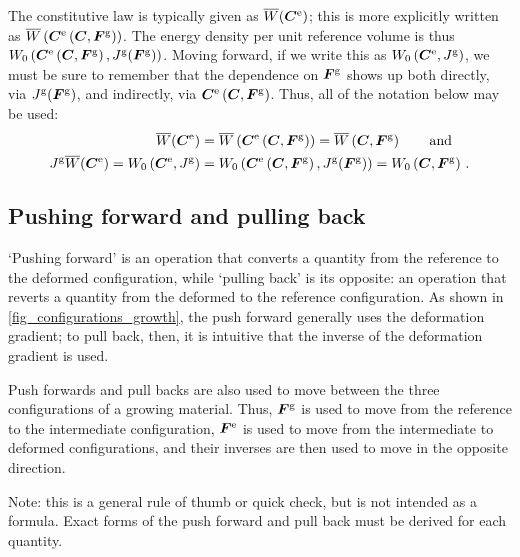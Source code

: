 \documentclass[10pt,letterpaper,oneside]{report}
\newcommand{\ten}[1]{\mbox{\boldmath $#1$}{}}
\newcommand{\scas}[1]{\mbox{{\scriptsize{${\rm{#1}}$}}}{}}
\begin{document}
The constitutive law is typically given as $\overline{W} (\ten{C}^{\scas{e}})$; this is more explicitly written as $\overline{W} \left(\ten{C}^{\scas{e}} \left( \ten{C}, \ten{F}^{\scas{g}} \right) \right)$.  
The energy density per unit reference volume is thus $W_0 \left(\ten{C}^{\scas{e}} \left( \ten{C}, \ten{F}^{\scas{g}} \right), J^{\scas{g}} ( \ten{F}^{\scas{g}} ) \right)$.  Moving forward, if we write this as $W_0 \left(\ten{C}^{\scas{e}}, J^{\scas{g}} \right)$, we must be sure to remember that the dependence on $\ten{F}^{\scas{g}}$ shows up both directly, via $J^{\scas{g}} (\ten{F}^{\scas{g}})$, and indirectly, via $\ten{C}^{\scas{e}} \left( \ten{C}, \ten{F}^{\scas{g}} \right)$.
Thus, all of the notation below may be used: 
\begin{align}
\overline{W} (\ten{C}^{\scas{e}}) &= \overline{W} \left(\ten{C}^{\scas{e}} \left( \ten{C}, \ten{F}^{\scas{g}} \right) \right) = \overline{W} \left( \ten{C}, \ten{F}^{\scas{g}} \right) \qquad \mbox{and} 
\\ 
J^{\scas{g}} \overline{W} (\ten{C}^{\scas{e}}) = W_0 \left(\ten{C}^{\scas{e}}, J^{\scas{g}} \right) &= W_0 \left(\ten{C}^{\scas{e}} \left( \ten{C}, \ten{F}^{\scas{g}} \right), J^{\scas{g}} ( \ten{F}^{\scas{g}} ) \right) = W_0 \left( \ten{C}, \ten{F}^{\scas{g}} \right) \, .
\end{align}


\subsection{Pushing forward and pulling back}
`Pushing forward' is an operation that converts a quantity from the reference to the deformed configuration, while `pulling back' is its opposite: an operation that reverts a quantity from the deformed to the reference configuration.  As shown in \autoref{fig_configurations_growth}, the push forward generally uses the deformation gradient; to pull back, then, it is intuitive that the inverse of the deformation gradient is used.  

Push forwards and pull backs are also used to move between the three configurations of a growing material.  Thus, $\ten{F}^{\scas{g}}$ is used to move from the reference to the intermediate configuration, $\ten{F}^{\scas{e}}$ is used to move from the intermediate to deformed configurations, and their inverses are then used to move in the opposite direction. 

Note: this is a general rule of thumb or quick check, but is not intended as a formula.  Exact forms of the push forward and pull back must be derived for each quantity.
\end{document}
